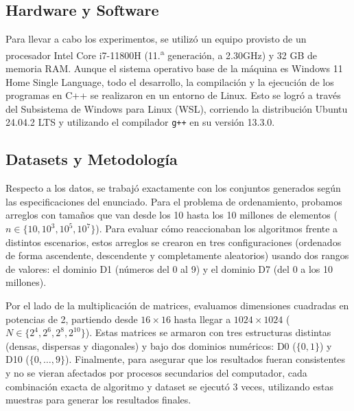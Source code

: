 \subsection{Hardware y Software}

Para llevar a cabo los experimentos, se utilizó un equipo provisto de un procesador Intel Core i7-11800H (11.\textsuperscript{a} generación, a 2.30GHz) y 32 GB de memoria RAM. Aunque el sistema operativo base de la máquina es Windows 11 Home Single Language, todo el desarrollo, la compilación y la ejecución de los programas en C++ se realizaron en un entorno de Linux. Esto se logró a través del Subsistema de Windows para Linux (WSL), corriendo la distribución Ubuntu 24.04.2 LTS y utilizando el compilador \texttt{g++} en su versión 13.3.0.

\subsection{Datasets y Metodología}

Respecto a los datos, se trabajó exactamente con los conjuntos generados según las especificaciones del enunciado. Para el problema de ordenamiento, probamos arreglos con tamaños que van desde los 10 hasta los 10 millones de elementos ($n \in \{10, 10^3, 10^5, 10^7\}$). Para evaluar cómo reaccionaban los algoritmos frente a distintos escenarios, estos arreglos se crearon en tres configuraciones (ordenados de forma ascendente, descendente y completamente aleatorios) usando dos rangos de valores: el dominio D1 (números del 0 al 9) y el dominio D7 (del 0 a los 10 millones).

Por el lado de la multiplicación de matrices, evaluamos dimensiones cuadradas en potencias de 2, partiendo desde $16 \times 16$ hasta llegar a $1024 \times 1024$ ($N \in \{2^4, 2^6, 2^8, 2^{10}\}$). Estas matrices se armaron con tres estructuras distintas (densas, dispersas y diagonales) y bajo dos dominios numéricos: D0 ($\{0,1\}$) y D10 ($\{0,\dots,9\}$). Finalmente, para asegurar que los resultados fueran consistentes y no se vieran afectados por procesos secundarios del computador, cada combinación exacta de algoritmo y dataset se ejecutó 3 veces, utilizando estas muestras para generar los resultados finales.
